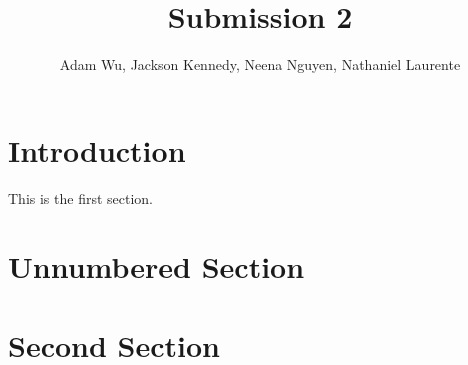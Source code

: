 \documentclass{article}
\title{Submission 2}
\author{Adam Wu, Jackson Kennedy, Neena Nguyen, Nathaniel Laurente}
\date{ }
\begin{document}
\maketitle

\tableofcontents

\section{Introduction}

This is the first section.

\blindtext

\section*{Unnumbered Section}

\blindtext

\section{Second Section}

\blindtext
\end{document}
